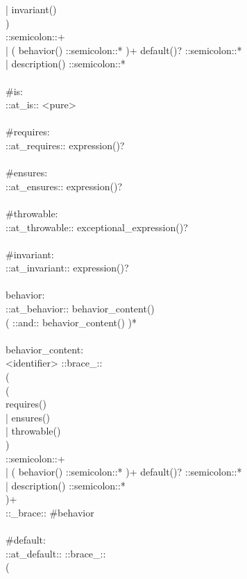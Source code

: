 \begin{bigbigpre}
      | invariant() \\
    ) \\
    ::semicolon::+ \\
  | ( behavior() ::semicolon::* )+ default()? ::semicolon::* \\
  | description() ::semicolon::* \\
 \\
#is: \\
    ::at_is:: <pure> \\
 \\
#requires: \\
    ::at_requires:: expression()? \\
 \\
#ensures: \\
    ::at_ensures:: expression()? \\
 \\
#throwable: \\
    ::at_throwable:: exceptional_expression()? \\
 \\
#invariant: \\
    ::at_invariant:: expression()? \\
 \\
behavior: \\
    ::at_behavior:: behavior_content() \\
    ( ::and:: behavior_content() )* \\
 \\
behavior_content: \\
    <identifier> ::brace_:: \\
    ( \\
        ( \\
            requires() \\
          | ensures() \\
          | throwable() \\
        ) \\
        ::semicolon::+ \\
      | ( behavior() ::semicolon::* )+ default()? ::semicolon::* \\
      | description() ::semicolon::* \\
    )+ \\
    ::_brace:: #behavior \\
 \\
#default: \\
    ::at_default:: ::brace_:: \\
    ( \\

\end{bigbigpre}
